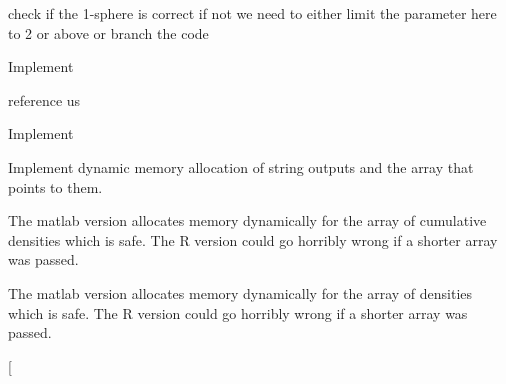 \begin{DoxyRefList}
\item[\label{todo__todo000014}%
\hypertarget{todo__todo000014}{}%
Global \hyperlink{_hyper_sphere_geodesic_8h_a0d1f54ac3a880c1c99d1ca5e85bd8256}{Hyper\-Sphere\-Geodesic\-Distance\-Check\-Parameters} (double $\ast$parameters, int $\ast$result, char $\ast$error\-\_\-str)]check if the 1-\/sphere is correct if not we need to either limit the parameter here to 2 or above or branch the code  
\item[\label{todo__todo000012}%
\hypertarget{todo__todo000012}{}%
Global \hyperlink{_hyper_sphere_geodesic_8h_ace4934a0a477c12fee4f0fccea40c50a}{Hyper\-Sphere\-Geodesic\-Distance\-Mean} (double $\ast$parameters)]Implement  
\item[\label{todo__todo000011}%
\hypertarget{todo__todo000011}{}%
Global \hyperlink{_hyper_sphere_geodesic_8h_a16d98ff2d1ad0e4d662b8631c72f9931}{Hyper\-Sphere\-Geodesic\-Distance\-P\-D\-F} (double t, double $\ast$parameters)]reference us  
\item[\label{todo__todo000013}%
\hypertarget{todo__todo000013}{}%
Global \hyperlink{_hyper_sphere_geodesic_8h_a203990a77a11670e5ab591d64461fca4}{Hyper\-Sphere\-Geodesic\-Distance\-Var} (double $\ast$parameters)]Implement  
\item[\label{todo__todo000018}%
\hypertarget{todo__todo000018}{}%
Global \hyperlink{group__api_gaf04b41252ebd1a3013b6bcb4dbbf3649}{Line\-Picking\-All\-Problems} (char $\ast$$\ast$, char $\ast$$\ast$)]Implement dynamic memory allocation of string outputs and the array that points to them.  
\item[\label{todo__todo000021}%
\hypertarget{todo__todo000021}{}%
Global \hyperlink{group__api_ga445ba2c007d60d789747cecbd5f874b9}{Line\-Picking\-C\-D\-F} (double $\ast$, double $\ast$, int $\ast$, int $\ast$, double $\ast$, int $\ast$, int $\ast$, char $\ast$$\ast$)]The matlab version allocates memory dynamically for the array of cumulative densities which is safe. The R version could go horribly wrong if a shorter array was passed.  
\item[\label{todo__todo000020}%
\hypertarget{todo__todo000020}{}%
Global \hyperlink{group__api_ga8feba9835984bd74f3d919f51389e573}{Line\-Picking\-P\-D\-F} (double $\ast$, double $\ast$, int $\ast$, int $\ast$, double $\ast$, int $\ast$, int $\ast$, char $\ast$$\ast$)]The matlab version allocates memory dynamically for the array of densities which is safe. The R version could go horribly wrong if a shorter array was passed.  
\item[\label{todo__todo000017}%
\hypertarget{todo__todo000017}{}%

\end{DoxyRefList}

